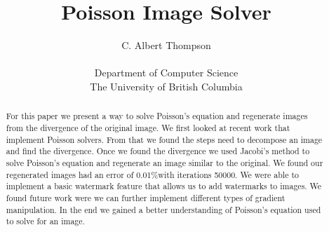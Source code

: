\documentclass[10pt,twopage]{acmsiggraph}
\begin{document}
\newcommand\result{0.01\%}
\newcommand\iteration{50000}

%
%

\title{Poisson Image Solver}

\newcommand\name{C. Albert Thompson}

\author{\name\\
\\
Department of Computer Science\\
The University of British Columbia}

\maketitle

%
%

\begin{abstract}
For this paper we present a way to solve Poisson's equation and regenerate images from the divergence of the original image. We first looked at recent work that implement Poisson solvers. From that we found the steps need to decompose an image and find the divergence. Once we found the divergence we used Jacobi's method to solve Poisson's equation and regenerate an image similar to the original.  We found our regenerated images had an error of \result with iterations \iteration. We were able to implement a basic watermark feature that allows us to add watermarks to images. We found future work were we can further implement different types of gradient manipulation. In the end we gained a better understanding of Poisson's equation used to solve for an image.
\end{abstract}

%
%
\end{document}
